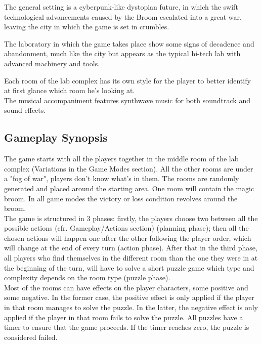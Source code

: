 The general setting is a cyberpunk-like dystopian future, in which the swift technological advancements caused by the Broom escalated into a great war, leaving the city in which the game is set in crumbles.

The laboratory in which the game takes place show some signs of decadence and abandonment, much like the city but appears as the typical hi-tech lab with advanced machinery and tools.


Each room of the lab complex has its own style for the player to better identify at first glance which room he's looking at. \\

The musical accompaniment features synthwave music for both soundtrack and sound effects.

\clearpage 

\subsection{Gameplay Synopsis}

The game starts with all the players together in the middle room of the lab complex (Variations in the Game Modes section). All the other rooms are
under a "fog of war", players don't know what's in them. The rooms are randomly generated and placed
around the starting area. One room will contain the magic broom. In all game modes the victory or loss condition revolves around the broom.\\

The game is structured in 3 phases: firstly, the players choose two between all the possible actions (cfr. Gameplay/Actions section)  (planning phase);
then all the chosen actions will happen one after the other following the player order, which will change at the end of every turn (action phase). After that in the third phase, all players who find themselves in the different room than the one they were in at the beginning of the turn, will have to solve a short puzzle game which type and complexity depends on the room type (puzzle phase). \\

Most of the rooms can have effects on the player characters, some positive and some negative. In the former case, the positive effect is only applied if the player in that room manages to solve the puzzle. In the latter, the negative effect is only applied if the player in that room fails to solve the puzzle. All puzzles have a timer to ensure that the game proceeds. If the timer reaches zero, the puzzle is considered failed. 

\clearpage 